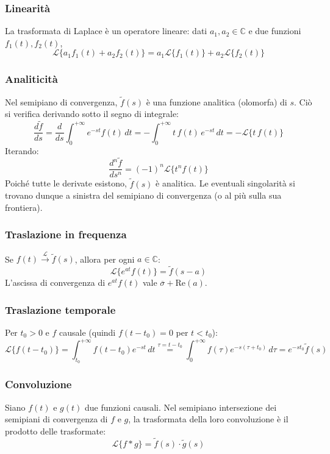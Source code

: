 \subsubsection*{Linearità}
La trasformata di Laplace è un operatore lineare: dati $a_1, a_2 \in \mathbb{C}$ e due funzioni $f_1(t), f_2(t)$,
\[
    \mathcal{L}\{a_1 f_1(t) + a_2 f_2(t)\} = a_1 \mathcal{L}\{f_1(t)\} + a_2 \mathcal{L}\{f_2(t)\}
\]

\subsubsection*{Analiticità}
Nel semipiano di convergenza, $\tilde{f}(s)$ è una funzione analitica (olomorfa) di $s$. Ciò si verifica derivando sotto il segno di integrale:
\[
    \frac{d\tilde{f}}{ds} = \frac{d}{ds} \int_0^{+\infty} e^{-st} f(t) \, dt = -\int_0^{+\infty} t \, f(t) \, e^{-st} \, dt = -\mathcal{L}\{t\, f(t)\}
\]
Iterando:
\[
    \frac{d^n \tilde{f}}{ds^n} = (-1)^n \mathcal{L}\{t^n f(t)\}
\]
Poiché tutte le derivate esistono, $\tilde{f}(s)$ è analitica. Le eventuali singolarità si trovano dunque a sinistra del semipiano di convergenza (o al più sulla sua frontiera).

\subsubsection*{Traslazione in frequenza}
Se $f(t) \xrightarrow{\mathcal{L}} \tilde{f}(s)$, allora per ogni $a \in \mathbb{C}$:
\[
    \mathcal{L}\{e^{at} f(t)\} = \tilde{f}(s - a)
\]
L'ascissa di convergenza di $e^{at} f(t)$ vale $\overline{\sigma} + \text{Re}(a)$.

\subsubsection*{Traslazione temporale}
Per $t_0 > 0$ e $f$ causale (quindi $f(t-t_0) = 0$ per $t < t_0$):
\[
    \mathcal{L}\{f(t - t_0)\} = \int_{t_0}^{+\infty} f(t - t_0) e^{-st} \, dt \overset{\tau = t - t_0}{=} \int_0^{+\infty} f(\tau) e^{-s(\tau + t_0)} \, d\tau = e^{-s t_0} \tilde{f}(s)
\]

\subsubsection*{Convoluzione}
Siano $f(t)$ e $g(t)$ due funzioni causali. Nel semipiano intersezione dei semipiani di convergenza di $f$ e $g$, la trasformata della loro convoluzione è il prodotto delle trasformate:
\[
    \mathcal{L}\{f * g\} = \tilde{f}(s) \cdot \tilde{g}(s)
\]

